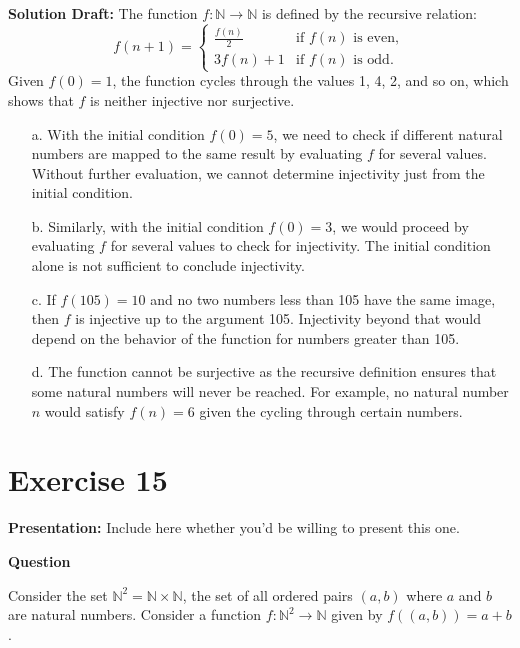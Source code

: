 \documentclass{article}
\begin{document}
\noindent\textbf{Solution Draft:} 
The function \( f : \mathbb{N} \rightarrow \mathbb{N} \) is defined by the recursive relation:
\[
f(n + 1) = \begin{cases}
\frac{f(n)}{2} & \text{if } f(n) \text{ is even}, \\
3f(n) + 1 & \text{if } f(n) \text{ is odd}.
\end{cases}
\]
Given \( f(0) = 1 \), the function cycles through the values 1, 4, 2, and so on, which shows that \( f \) is neither injective nor surjective.

\begin{enumerate}
\item[a.]
With the initial condition \( f(0) = 5 \), we need to check if different natural numbers are mapped to the same result by evaluating \( f \) for several values. Without further evaluation, we cannot determine injectivity just from the initial condition.

\item[b.]
Similarly, with the initial condition \( f(0) = 3 \), we would proceed by evaluating \( f \) for several values to check for injectivity. The initial condition alone is not sufficient to conclude injectivity.

\item[c.]
If \( f(105) = 10 \) and no two numbers less than 105 have the same image, then \( f \) is injective up to the argument 105. Injectivity beyond that would depend on the behavior of the function for numbers greater than 105.

\item[d.]
The function cannot be surjective as the recursive definition ensures that some natural numbers will never be reached. For example, no natural number \( n \) would satisfy \( f(n) = 6 \) given the cycling through certain numbers.
\end{enumerate}

\section*{Exercise 15}  

\noindent\textbf{Presentation:} Include here whether you'd be willing to present this one. 

\vspace{0.5cm} %

\noindent\textbf{Question}

Consider the set \( \mathbb{N}^2 = \mathbb{N} \times \mathbb{N} \), the set of all ordered pairs \( (a, b) \) where \( a \) and \( b \) are natural numbers. Consider a function \( f : \mathbb{N}^2 \rightarrow \mathbb{N} \) given by \( f((a, b)) = a + b \).
\end{document}
